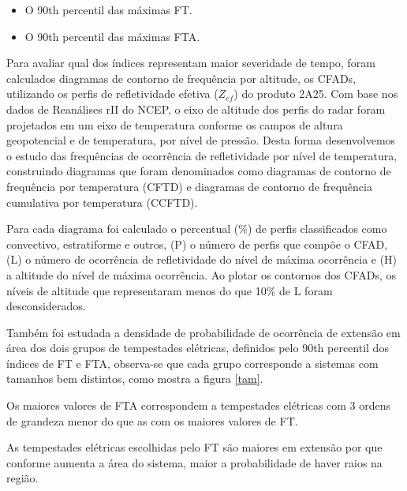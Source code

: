 \begin{itemize}
\item O 90th percentil das máximas FT.
\item O 90th percentil das máximas FTA.
\end{itemize}

Para avaliar qual dos índices representam maior severidade de tempo, foram calculados diagramas de contorno de frequência por altitude, os CFADs, utilizando os perfis de refletividade efetiva ($Z_{ef}$) do produto 2A25. Com base nos dados de Reanálises rII do NCEP, o eixo de altitude dos perfis do radar foram projetados em um eixo de temperatura conforme os campos de altura geopotencial e de temperatura, por nível de pressão. Desta forma desenvolvemos o estudo das frequências de ocorrência de refletividade por nível de temperatura, construindo diagramas que foram denominados como diagramas de contorno de frequência por temperatura (CFTD) e diagramas de contorno de frequência cumulativa por temperatura (CCFTD).


Para cada diagrama foi calculado o percentual (\%) de perfis classificados como convectivo, estratiforme e outros, (P) o número de perfis que compõe o CFAD, (L) o número de ocorrência de refletividade do nível de máxima ocorrência e (H) a altitude do nível de máxima ocorrência. Ao plotar os contornos dos CFADs, os níveis de altitude que representaram menos do que 10\% de L foram desconsiderados.



Também foi estudada a densidade de probabilidade de ocorrência de extensão em área dos dois grupos de tempestades elétricas, definidos pelo 90th percentil dos índices de FT e FTA, observa-se que cada grupo corresponde a sistemas com tamanhos bem distintos, como mostra a figura \ref{tam}.  

Os maiores valores de FTA correspondem a tempestades elétricas com 3 ordens de grandeza menor do que as com os maiores valores de FT.

As tempestades elétricas escolhidas pelo FT são maiores em extensão por que conforme aumenta a área do sistema, maior a probabilidade de haver raios na região.

